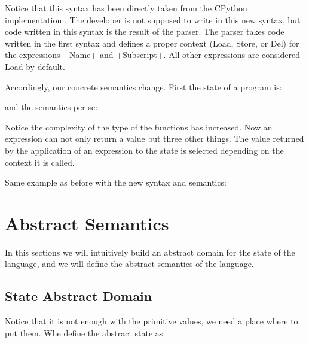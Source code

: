 Notice that this syntax has been directly taken from the CPython implementation
\autocite{van2007python}. The developer is not supposed to write in this new syntax, but
code written in this syntax is the result of the parser. The parser takes code written in
the first syntax and defines a proper context (Load, Store, or Del) for the expressions
\pycode+Name+ and \pycode+Subscript+. All other expressions are considered Load by default.

Accordingly, our concrete semantics change. First the state of a program is:


and the semantics per se:


Notice the complexity of the type of the functions has increased. Now an expression can
not only return a value but three other things. The value returned by the application of
an expression to the state is selected depending on the context it is called.

Same example as before with the new syntax and semantics:



\section{Abstract Semantics}

In this sections we will intuitively build an abstract domain for the state of the
language, and we will define the abstract semantics of the language.

\subsection{State Abstract Domain}


Notice that it is not enough with the primitive values, we need a place where to put them.
Whe define the abstract state as 

